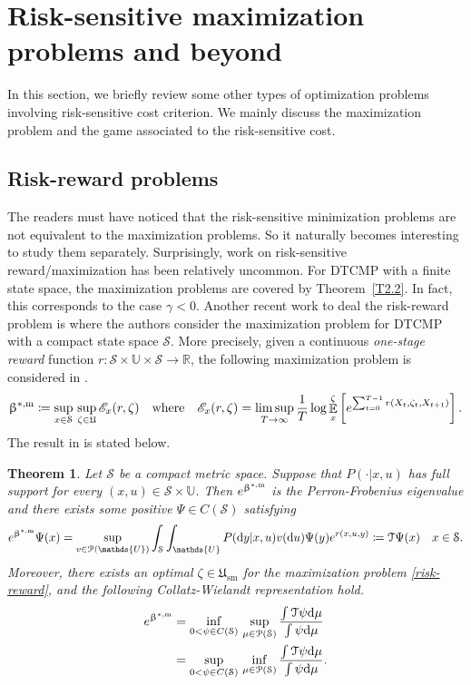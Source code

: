 \documentclass[notitlepage,11pt,reqno]{amsart}
\numberwithin{equation}{section}
\theoremstyle{plain}
\newtheorem{theorem}{Theorem}[section]
\theoremstyle{definition}
\theoremstyle{remark}
\newcommand{\Act}{{\mathds{U}}}
\newcommand{\sE}{{\mathscr{E}}}     %
\newcommand{\Pm}{{\mathcal{P}}}     %
\newcommand{\cS}{{\mathcal{S}}}     %
\newcommand{\cT}{{\mathcal{T}}}
\newcommand{\Uadm}{\mathfrak{U}}
\newcommand{\Usm}{\mathfrak{U}_{\mathrm{sm}}}
\newcommand{\RR}{\mathds{R}} %
\DeclareMathOperator{\Exp}{\mathbb{E}} %
\newcommand{\D}{\mathrm{d}} %
\newcommand{\df}{\coloneqq}
\begin{document}
\section{Risk-sensitive maximization problems and beyond}

In this section, we briefly review some other types of optimization problems involving risk-sensitive cost criterion. We mainly discuss the maximization problem and the game 
associated to the risk-sensitive cost.

\subsection{Risk-reward problems}
The readers must have noticed that the risk-sensitive minimization problems are not equivalent to the maximization problems. So it naturally becomes interesting to study them separately.
Surprisingly, work on risk-sensitive reward/maximization has been relatively uncommon.
For DTCMP with a finite state space, the maximization problems are covered by Theorem~\ref{T2.2}. In fact, this corresponds to the case $\gamma<0$. Another recent work to deal the risk-reward 
problem is \cite{MR3629428} where the authors consider the maximization problem for DTCMP with a compact state space $\cS$. More precisely, given a continuous
{\it one-stage reward} function $r:\cS\times\Act\times\cS\to \RR$, the following maximization problem is considered in \cite{MR3629428}.
\begin{equation}\label{risk-reward}
\upbeta^{*,{\rm m}}\df \sup_{x\in\cS}\, \sup_{\zeta\in\Uadm}\sE_x(r, \zeta)\quad \text{where}\quad 
\sE_x(r, \zeta)=\limsup_{T\to\infty}\frac{1}{T}\log\Exp_x^\zeta\left[e^{\sum_{t=0}^{T-1} r(X_t, \zeta_t, X_{t+1})}\right].
\end{equation}
The result in \cite[Theorem~2.2 and 2.3]{MR3629428} is stated below.
\begin{theorem}
Let $\cS$ be a compact metric space.
Suppose that $P(\cdot|x, u)$ has full support for every $(x, u)\in\cS\times\Act$. Then $e^{\upbeta^{*,{\rm m}}}$ is the Perron-Frobenius eigenvalue and there exists some positive $\Psi\in C(\cS)$ satisfying
$$e^{\upbeta^{*,{\rm m}}} \Psi(x)=\sup_{v\in\Pm(\Act)}\int_{\cS}\int_{\Act} P(\D{y}|x, u) v(\D{u}) \Psi(y) e^{r(x, u, y)}\df \cT\Psi(x)\quad x\in\cS.$$
Moreover, there exists an optimal $\zeta\in\Usm$ for the maximization problem \eqref{risk-reward}, and the following Collatz-Wielandt representation hold.
\begin{align*}
e^{\upbeta^{*,{\rm m}}} & = \inf_{0<\psi\in C(\cS)}\, \sup_{\mu\in\Pm(\cS)} \frac{\int \cT \psi \D\mu}{\int \psi \D\mu}
\\
& = \sup_{0<\psi\in C(\cS)}\, \inf_{\mu\in\Pm(\cS)} \frac{\int \cT \psi \D\mu}{\int \psi \D\mu}.
\end{align*}
\end{theorem}
\end{document}
